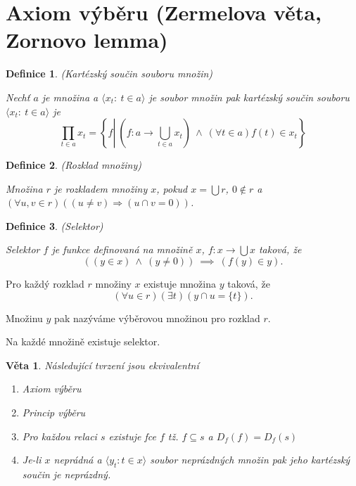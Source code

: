 \documentclass[a4paper,10pt,titlepage]{article} \usepackage[utf8]{inputenc}
\newtheorem{theorem}{Věta}
\newtheorem{define}{Definice}
\begin{document}
\section {Axiom výběru (Zermelova věta, Zornovo lemma)}

\begin{define}
(Kartézský součin souboru množin)

Nechť $a$ je množina a $\langle  x_t :\ t\in a\rangle$ je soubor množin pak kartézský součin souboru $\langle x_t :\ t\in a\rangle$ je
\[
	\prod_{t \in a} x_t = \left\{f \left| \ \left(f:a \rightarrow \bigcup_{t \in a} x_t\right) \ 
	\wedge \ \left(\forall t \in a\right) f(t) \in x_t \right. \right\} 
\]
\end{define}

\begin{define}
(Rozklad množiny)

Množina $r$ je rozkladem množiny $x$, pokud $x = \bigcup r$, $0 \notin r$ a $(\forall u,v \in r)((u \neq v) \Rightarrow (u \cap v = 0))$.
\end{define}

\begin{define}
(Selektor)

Selektor $f$ je funkce definovaná na množině $x$, $f: x \rightarrow \bigcup x$ taková, že
\[
	((y \in x) \ \wedge \ (y\neq 0)) \ \implies\ (f(y) \in y).
\]
\end{define}

\medskip
{}

Pro každý rozklad $r$ množiny $x$ existuje množina $y$ taková, že
\[
	(\forall u \in r) (\exists t) ( y \cap u = \{t\}).
\]

Množinu $y$ pak nazýváme výběrovou množinou pro rozklad $r$.

\medskip
{}

Na každé množině existuje selektor.

\medskip

\begin{theorem}
Následující tvrzení jsou ekvivalentní
\begin{enumerate}
\item Axiom výběru
\item Princip výběru
\item Pro každou relaci $s$ existuje fce $f$ tž. $f \subseteq s$ a $D_f(f) = D_f(s)$
\item Je-li $x$ neprádná a $\langle y_t : t \in x \rangle$ soubor neprázdných množin pak jeho kartézský součin je neprázdný.
\end{enumerate}
\end{theorem}
\end{document}
